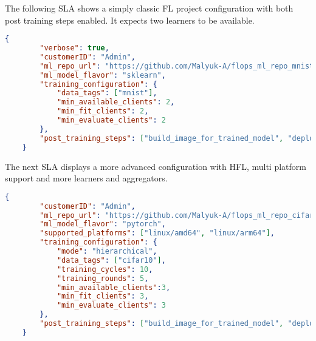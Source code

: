 The following SLA shows a simply classic FL project configuration with both post training steps enabled.
It expects two learners to be available.

\begin{lstlisting}[language=json]
    {
        "verbose": true,
        "customerID": "Admin",
        "ml_repo_url": "https://github.com/Malyuk-A/flops_ml_repo_mnist_sklearn",
        "ml_model_flavor": "sklearn",
        "training_configuration": {
            "data_tags": ["mnist"],
            "min_available_clients": 2,
            "min_fit_clients": 2,
            "min_evaluate_clients": 2
        },
        "post_training_steps": ["build_image_for_trained_model", "deploy_trained_model_image"],
    }
\end{lstlisting}

The next SLA displays a more advanced configuration with HFL, multi platform support and more learners and aggregators.

\begin{lstlisting}[language=json]
    {
        "customerID": "Admin",
        "ml_repo_url": "https://github.com/Malyuk-A/flops_ml_repo_cifar10_pytorch",
        "ml_model_flavor": "pytorch",
        "supported_platforms": ["linux/amd64", "linux/arm64"],
        "training_configuration": {
            "mode": "hierarchical",
            "data_tags": ["cifar10"],
            "training_cycles": 10,
            "training_rounds": 5,
            "min_available_clients":3,
            "min_fit_clients": 3,
            "min_evaluate_clients": 3
        },
        "post_training_steps": ["build_image_for_trained_model", "deploy_trained_model_image"],
    }
\end{lstlisting}